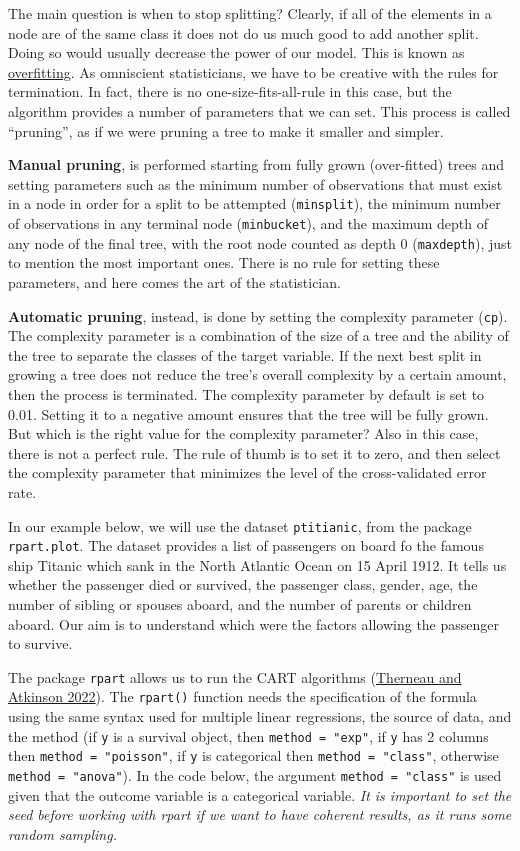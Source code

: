 \documentclass[
]{svmono}
\begin{document}
The main question is when to stop splitting? Clearly, if all of the
elements in a node are of the same class it does not do us much good to
add another split. Doing so would usually decrease the power of our
model. This is known as \ul{overfitting}. As omniscient
statisticians, we have to be creative with the rules for termination. In
fact, there is no one-size-fits-all-rule in this case, but the algorithm
provides a number of parameters that we can set. This process is called
``pruning'', as if we were pruning a tree to make it smaller and simpler.

\textbf{Manual pruning}, is performed starting from fully grown (over-fitted)
trees and setting parameters such as the minimum number of observations
that must exist in a node in order for a split to be attempted
(\texttt{minsplit}), the minimum number of observations in any terminal node
(\texttt{minbucket}), and the maximum depth of any node of the final tree, with
the root node counted as depth 0 (\texttt{maxdepth}), just to mention the most
important ones. There is no rule for setting these parameters, and here
comes the art of the statistician.

\textbf{Automatic pruning}, instead, is done by setting the complexity
parameter (\texttt{cp}). The complexity parameter is a combination of the size
of a tree and the ability of the tree to separate the classes of the
target variable. If the next best split in growing a tree does not
reduce the tree's overall complexity by a certain amount, then the
process is terminated. The complexity parameter by default is set to
0.01. Setting it to a negative amount ensures that the tree will be
fully grown. But which is the right value for the complexity parameter?
Also in this case, there is not a perfect rule. The rule of thumb is to
set it to zero, and then select the complexity parameter that minimizes
the level of the cross-validated error rate.

In our example below, we will use the dataset \texttt{ptitianic}, from the
package \texttt{rpart.plot}. The dataset provides a list of passengers on board
fo the famous ship Titanic which sank in the North Atlantic Ocean on 15
April 1912. It tells us whether the passenger died or survived, the
passenger class, gender, age, the number of sibling or spouses aboard,
and the number of parents or children aboard. Our aim is to understand
which were the factors allowing the passenger to survive.

The package \texttt{rpart} allows us to run the CART algorithms
(\protect\hyperlink{ref-therneau2022}{Therneau and Atkinson 2022}). The \texttt{rpart()} function needs the specification of the
formula using the same syntax used for multiple linear regressions, the
source of data, and the method (if \texttt{y} is a survival object, then
\texttt{method\ =\ "exp"}, if \texttt{y} has 2 columns then \texttt{method\ =\ "poisson"}, if \texttt{y}
is categorical then \texttt{method\ =\ "class"}, otherwise \texttt{method\ =\ "anova"}).
In the code below, the argument \texttt{method\ =\ "class"} is used given that
the outcome variable is a categorical variable. \emph{It is important to set
the seed before working with rpart if we want to have coherent results,
as it runs some random sampling.}
\end{document}
